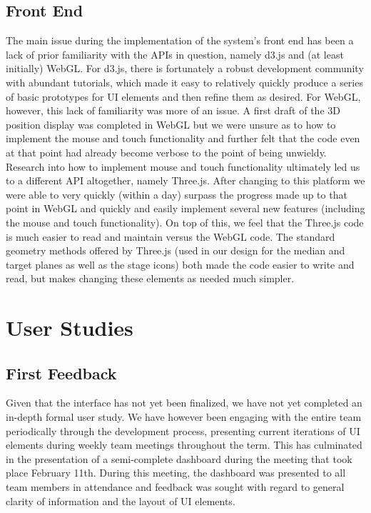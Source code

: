 \documentclass[journal,10pt,onecolumn,compsoc]{IEEEtran}
\begin{document}
	\subsection{Front End}
		The main issue during the implementation of the system's front end has been a lack of prior familiarity with the APIs in question, namely d3.js and (at least initially) WebGL.
		For d3.js, there is fortunately a robust development community with abundant tutorials, which made it easy to relatively quickly produce a series of basic prototypes for UI elements and then refine them as desired.
		For WebGL, however, this lack of familiarity was more of an issue.
		A first draft of the 3D position display was completed in WebGL but we were unsure as to how to implement the mouse and touch functionality and further felt that the code even at that point had already become verbose to the point of being unwieldy.
		Research into how to implement mouse and touch functionality ultimately led us to a different API altogether, namely Three.js.
		After changing to this platform we were able to very quickly (within a day) surpass the progress made up to that point in WebGL and quickly and easily implement several new features (including the mouse and touch functionality).
		On top of this, we feel that the Three.js code is much easier to read and maintain versus the WebGL code.
		The standard geometry methods offered by Three.js (used in our design for the median and target planes as well as the stage icons) both made the code easier to write and read, but makes changing these elements as needed much simpler.		
\newpage


\section{User Studies}

	\subsection{First Feedback}
		Given that the interface has not yet been finalized, we have not yet completed an in-depth formal user study.
		We have however been engaging with the entire team periodically through the development process, presenting current iterations of UI elements during weekly team meetings throughout the term.
		This has culminated in the presentation of a semi-complete dashboard during the meeting that took place February 11th.
		During this meeting, the dashboard was presented to all team members in attendance and feedback was sought with regard to general clarity of information and the layout of UI elements.
	
\end{document}
